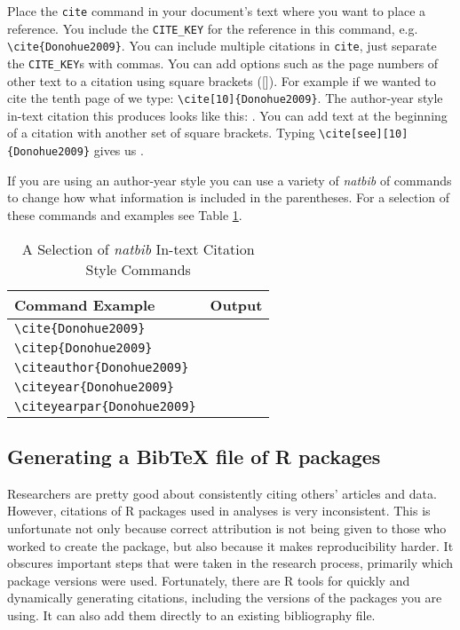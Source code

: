 Place the \texttt{cite} command in your document's text where you want to place a reference. You include the \verb|CITE_KEY| for the reference in this command, e.g. \verb|\cite{Donohue2009}|. You can include multiple citations in \texttt{cite}, just separate the \verb|CITE_KEY|s with commas. You can add options such as the page numbers of other text to a citation using square brackets ([]). For example if we wanted to cite the tenth page of \cite{Donohue2009} we type: \verb|\cite[10]{Donohue2009}|. The author-year style in-text citation this produces looks like this: \cite[10]{Donohue2009}. You can add text at the beginning of a citation with another set of square brackets. Typing \verb|\cite[see][10]{Donohue2009}| gives us \cite[see][10]{Donohue2009}.

If you are using an author-year style you can use a variety of \emph{natbib} of commands to change how what information is included in the parentheses. For a selection of these commands and examples see Table \ref{NatbibTable}.

\begin{table}
    \caption{A Selection of \emph{natbib} In-text Citation Style Commands}
    \label{NatbibTable}
        \begin{center}
            \begin{tabular}{l r}
                \hline
                Command Example & Output \\[0.25cm]
                \hline\hline
                \verb|\cite{Donohue2009}| & \cite{Donohue2009} \\
                \verb|\citep{Donohue2009}| & \citep{Donohue2009} \\
                \verb|\citeauthor{Donohue2009}| & \citeauthor{Donohue2009} \\
                \verb|\citeyear{Donohue2009}| & \citeyear{Donohue2009} \\
                \verb|\citeyearpar{Donohue2009}| & \citeyearpar{Donohue2009} \\
                \hline
            \end{tabular}
        \end{center}
\end{table}

\subsection{Generating a BibTeX file of R packages}

Researchers are pretty good about consistently citing others' articles and data. However, citations of R packages used in analyses is very inconsistent. This is unfortunate not only because correct attribution is not being given to those who worked to create the package, but also because it makes reproducibility harder. It obscures important steps that were taken in the research process, primarily which package versions were used. Fortunately, there are R tools for quickly and dynamically generating citations, including the versions of the packages you are using. It can also add them directly to an existing bibliography file.


